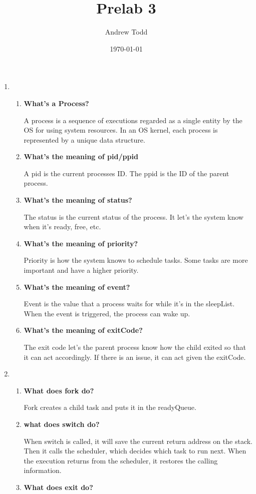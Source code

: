 \documentclass{article}
\title{Prelab 3}
\author{Andrew Todd}
\date{\today}
\begin{document}
\maketitle

\begin{enumerate}
    \item \begin{enumerate}
    \item \textbf{What's a Process?}
        
    A process is a sequence of executions regarded as a single entity by the OS for using system resources. In an OS kernel, each process is represented by a unique data structure.
    \item \textbf {What's the meaning of pid/ppid}

    A pid is the current processes ID. The ppid is the ID of the parent process.
    \item \textbf{What's the meaning of status?}

    The status is the current status of the process. It let's the system know when it's ready, free, etc.
    \item \textbf{What's the meaning of priority?}

    Priority is how the system knows to schedule tasks. Some tasks are more important and have a higher priority.
    \item \textbf{What's the meaning of event?}

    Event is the value that a process waits for while it's in the sleepList. When the event is triggered, the process can wake up.
    \item \textbf{What's the meaning of exitCode?}
    
    The exit code let's the parent process know how the child exited so that it can act accordingly. If there is an issue, it can act given the exitCode.
    \end{enumerate}
    \item \begin{enumerate}
        \item \textbf{What does fork do?}

        Fork creates a child task and puts it in the readyQueue. 
        \item \textbf{what does switch do?}

        When switch is called, it will save the current return address on the stack. Then it calls the scheduler, which decides which task to run next. When the execution returns from the scheduler, it restores the calling information.
        \item \textbf{What does exit do?}


\end{enumerate}
\end{enumerate}
\end{document}
